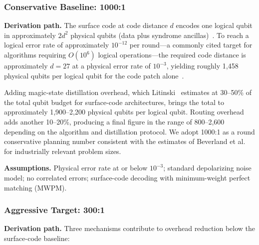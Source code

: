 \documentclass[conference]{IEEEtran}
\begin{document}
\subsubsection{Conservative Baseline: 1000:1}

\textbf{Derivation path.} The surface code at code distance $d$ encodes one logical qubit in approximately $2d^2$ physical qubits (data plus syndrome ancillas)~\cite{fowler2012}. To reach a logical error rate of approximately $10^{-12}$ per round---a commonly cited target for algorithms requiring $O(10^6)$ logical operations---the required code distance is approximately $d = 27$ at a physical error rate of $10^{-3}$, yielding roughly 1,458 physical qubits per logical qubit for the code patch alone~\cite{fowler2012, dennis2002}.

Adding magic-state distillation overhead, which Litinski~\cite{litinski2019} estimates at 30--50\% of the total qubit budget for surface-code architectures, brings the total to approximately 1,900--2,200 physical qubits per logical qubit. Routing overhead adds another 10--20\%, producing a final figure in the range of 800--2,600 depending on the algorithm and distillation protocol. We adopt 1000:1 as a round conservative planning number consistent with the estimates of Beverland et al.~\cite{beverland2022} for industrially relevant problem sizes.

\textbf{Assumptions.} Physical error rate at or below $10^{-3}$; standard depolarizing noise model; no correlated errors; surface-code decoding with minimum-weight perfect matching (MWPM).

\subsubsection{Aggressive Target: 300:1}

\textbf{Derivation path.} Three mechanisms contribute to overhead reduction below the surface-code baseline:
\end{document}
